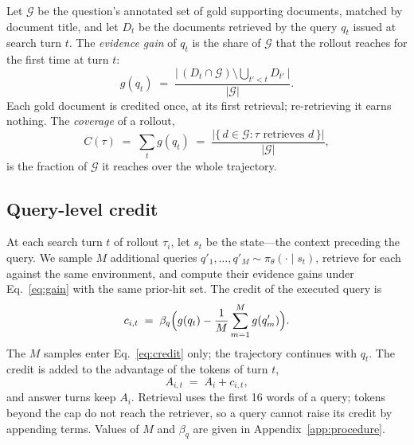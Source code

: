 Let $\mathcal{G}$ be the question's annotated set of gold supporting
documents, matched by document title, and let $D_t$ be the documents
retrieved by the query $q_t$ issued at search turn $t$. The
\emph{evidence gain} of $q_t$ is the share of $\mathcal{G}$ that the
rollout reaches for the first time at turn $t$:
\begin{equation}
g(q_t) \;=\; \frac{\bigl|\,(D_t \cap \mathcal{G}) \setminus
\textstyle\bigcup_{t'<t} D_{t'}\,\bigr|}{|\mathcal{G}|}.
\label{eq:gain}
\end{equation}
Each gold document is credited once, at its first retrieval;
re-retrieving it earns nothing. The \emph{coverage} of a rollout,
\begin{equation}
C(\tau) \;=\; \sum_t g(q_t) \;=\; \frac{\bigl|\{\, d \in \mathcal{G} :
\tau \text{ retrieves } d \,\}\bigr|}{|\mathcal{G}|},
\label{eq:coverage}
\end{equation}
is the fraction of $\mathcal{G}$ it reaches over the whole trajectory.

\subsection{Query-level credit}
\label{sec:method-credit}

At each search turn $t$ of rollout $\tau_i$, let $s_t$ be the state---the
context preceding the query. We sample $M$ additional queries
$q'_1,\ldots,q'_M \sim \pi_\theta(\cdot \mid s_t)$, retrieve for each
against the same environment, and compute their evidence gains under
Eq.~\ref{eq:gain} with the same prior-hit set. The credit of the
executed query is
\begin{equation}
c_{i,t} \;=\; \beta_q \Bigl( g(q_t) - \frac{1}{M}\sum_{m=1}^{M}
g(q'_m) \Bigr).
\label{eq:credit}
\end{equation}
The $M$ samples enter Eq.~\ref{eq:credit} only; the trajectory
continues with $q_t$. The credit is added to the advantage of the
tokens of turn $t$,
\begin{equation}
A_{i,t} \;=\; A_i + c_{i,t},
\label{eq:turn-adv}
\end{equation}
and answer turns keep $A_i$. Retrieval uses the first 16 words of a
query; tokens beyond the cap do not reach the retriever, so a query
cannot raise its credit by appending terms. Values of $M$ and $\beta_q$
are given in Appendix~\ref{app:procedure}.

